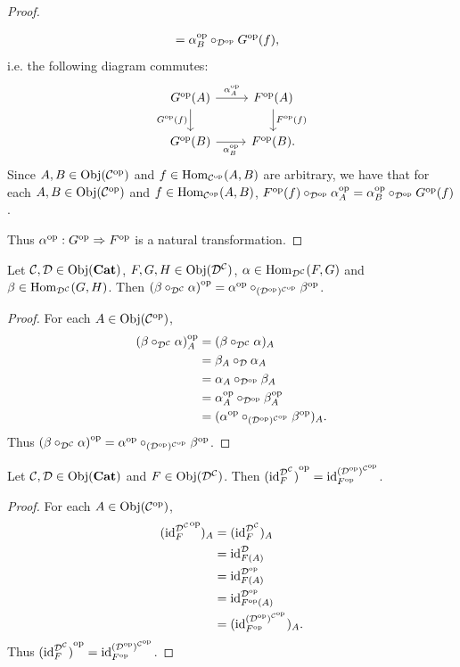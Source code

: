 \documentclass{book}
\begin{document}
\begin{proof}
\begin{itemize}
\begin{align*}
				& = \op{\al}_B \circ_{\op{\MD}} \op{G}(f),
			\end{align*}
			i.e. the following diagram commutes:
			\[ 
			\begin{tikzcd}
				\op{G}(A)  \arrow[r, " \op{\al}_A "]  \arrow[d, "\op{G}(f)"']  & \op{F}(A)   \arrow[d, "\op{F}(f)"] \\
				\op{G}(B) \arrow[r, "\op{\al}_B"'] &  \op{F}(B).
			\end{tikzcd}
			\]
			Since $A, B \in \Obj(\op{\MC})$ and $f \in \Hom_{\op{\MC}}(A, B)$ are arbitrary, we have that for each $A, B \in \Obj(\op{\MC})$ and $f \in \Hom_{\op{\MC}}(A, B)$, $\op{F}(f) \circ_{\op{\MD}} \op{\al}_A = \op{\al}_B \circ_{\op{\MD}} \op{G}(f)$. 
		\end{itemize}
		Thus $\op{\al}: \op{G} \Rightarrow \op{F}$ is a natural transformation.
	\end{proof}
	
	\begin{ex} 
		Let $\MC, \MD \in \Obj(\bCat)$, $F,G,H \in \Obj(\MD^{\MC})$, $\al \in \Hom_{\MD^{\MC}}(F,G)$ and $\be \in \Hom_{\MD^{\MC}}(G,H)$. Then $\op{(\be \circ_{\MD^{\MC}} \al)} = \op{\al} \circ_{(\op{\MD})^{\op{\MC}}} \op{\be}$.
	\end{ex}
	
	\begin{proof}
		For each $A \in \Obj(\op{\MC})$,
		\begin{align*}
			\op{(\be \circ_{\MD^{\MC}} \al)}_A
			& = (\be \circ_{\MD^{\MC}} \al)_A \\
			& = \be_A \circ_{\MD} \al_A \\
			& = \al_A \circ_{\op{\MD}} \be_A \\
			& = \op{\al}_A \circ_{\op{\MD}} \op{\be}_A \\
			& = (\op{\al} \circ_{(\op{\MD})^{\op{\MC}}} \op{\be})_A.
		\end{align*}
		Thus $\op{(\be \circ_{\MD^{\MC}} \al)} = \op{\al} \circ_{(\op{\MD})^{\op{\MC}}} \op{\be}$.
	\end{proof}
	
	\begin{ex} 
		Let $\MC, \MD \in \Obj(\bCat)$ and $F \in \Obj(\MD^{\MC})$. Then $\op{(\id_F^{\MD^{\MC}})} = \id_{\op{F}}^{(\op{\MD})^{\op{\MC}}}$. 
	\end{ex}
	
	\begin{proof}
		For each $A \in \Obj(\op{\MC})$, 
		\begin{align*}
			(\op{\id_F^{\MD^{\MC}}})_A
			& = (\id_F^{\MD^{\MC}})_A \\
			& = \id_{F(A)}^{\MD} \\
			& = \id_{F(A)}^{\op{\MD}} \\
			& = \id_{\op{F}(A)}^{\op{\MD}} \\
			& = (\id_{\op{F}}^{(\op{\MD})^{\op{\MC}}})_A.
		\end{align*}
		Thus $\op{(\id_F^{\MD^{\MC}})} = \id_{\op{F}}^{(\op{\MD})^{\op{\MC}}}$.
	\end{proof}
	
\end{document}
